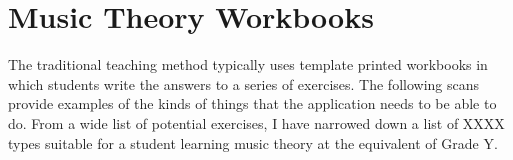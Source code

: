 \section{Music Theory Workbooks}\label{sec:music-theory-workbooks}

The traditional teaching method typically uses template printed workbooks in which students write the answers to a series of exercises.  The following scans provide examples of the kinds of things that the application needs to be able to do.
From a wide list of potential exercises, I have narrowed down a list of XXXX types suitable for a student learning music theory at the equivalent of Grade Y. 

